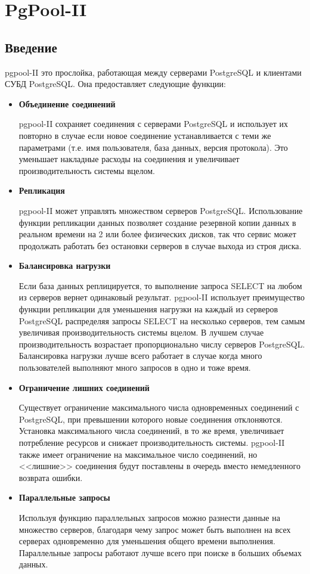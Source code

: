 \chapter{PgPool-II}
\section{Введение}
pgpool-II это прослойка, работающая между серверами PostgreSQL и клиентами СУБД PostgreSQL. 
Она предоставляет следующие функции:
\begin{itemize}
\item \textbf{Объединение соединений} 

pgpool-II сохраняет соединения с серверами PostgreSQL и использует их повторно в случае если новое 
соединение устанавливается с теми же параметрами (т.е. имя пользователя, база данных, версия протокола). 
Это уменьшает накладные расходы на соединения и увеличивает производительность системы вцелом.

\item \textbf{Репликация} 

pgpool-II может управлять множеством серверов PostgreSQL. Использование функции репликации данных позволяет 
создание резервной копии данных в реальном времени на  2 или более физических дисков, так что сервис может 
продолжать работать без остановки серверов в случае выхода из строя диска.

\item \textbf{Балансировка нагрузки}

Если база данных реплицируется, то выполнение запроса SELECT на любом из серверов вернет одинаковый результат. 
pgpool-II использует преимущество функции репликации для уменьшения нагрузки на каждый из серверов PostgreSQL 
распределяя запросы SELECT на несколько серверов, тем самым увеличивая производительность системы вцелом. 
В лучшем случае производительность возрастает пропорционально числу серверов PostgreSQL. Балансировка нагрузки 
лучше всего работает в случае когда много пользователей выполняют много запросов в одно и тоже время.

\item \textbf{Ограничение лишних соединений}

Существует ограничение максимального числа одновременных соединений с PostgreSQL, при превышении которого новые 
соединения отклоняются. Установка максимального числа соединений, в то же время, увеличивает потребление ресурсов и 
снижает производительность системы. pgpool-II также имеет ограничение на максимальное число соединений, но <<лишние>> 
соединения будут поставлены в очередь вместо немедленного возврата ошибки.

\item \textbf{Параллельные запросы}

Используя функцию параллельных запросов можно разнести данные на множество серверов, благодаря чему запрос может 
быть выполнен на всех серверах одновременно для уменьшения общего времени выполнения. Параллельные запросы работают 
лучше всего при поиске в больших объемах данных.
\end{itemize}

